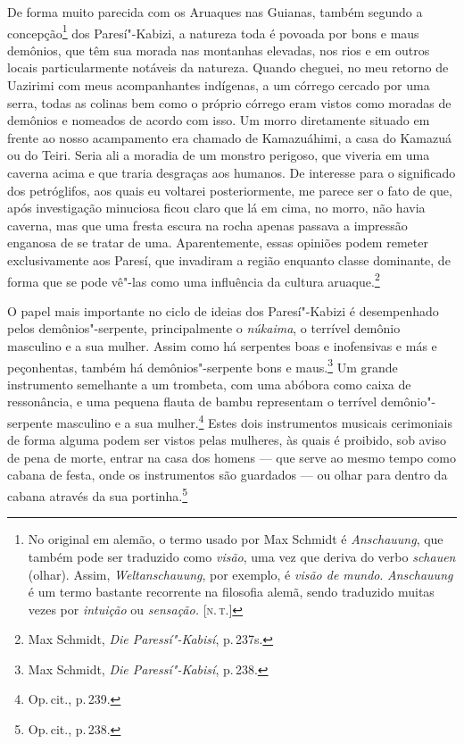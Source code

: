 De forma muito parecida com os Aruaques nas Guianas, também segundo a
concepção\footnote{No original em alemão, o termo usado por Max
  Schmidt é \textit{Anschauung}, que também pode ser traduzido como
  \textit{visão}, uma vez que deriva do verbo \textit{schauen} (olhar).
  Assim, \textit{Weltanschauung}, por exemplo, é \textit{visão de mundo}.
  \textit{Anschauung} é um termo bastante recorrente na filosofia alemã,
  sendo traduzido muitas vezes por \textit{intuição} ou \textit{sensação.}
  {[}\textsc{n.\,t.}{]}} dos Paresí"-Kabizi, a natureza toda é povoada por bons e maus
demônios, que têm sua morada nas montanhas elevadas, nos rios e em
outros locais particularmente notáveis da natureza. Quando cheguei, no
meu retorno de Uazirimi com meus acompanhantes indígenas, a um córrego
cercado por uma serra, todas as colinas bem como o próprio córrego eram
vistos como moradas de demônios e nomeados de acordo com isso. Um morro
diretamente situado em frente ao nosso acampamento era chamado de
Kamazuáhimi, a casa do Kamazuá ou do Teiri. Seria ali a moradia de um
monstro perigoso, que viveria em uma caverna acima e que traria
desgraças aos humanos. De interesse para o significado dos petróglifos,
aos quais eu voltarei posteriormente, me parece ser o fato de que, após
investigação minuciosa ficou claro que lá em cima, no morro, não havia
caverna, mas que uma fresta escura na rocha apenas passava a impressão
enganosa de se tratar de uma. Aparentemente, essas opiniões podem
remeter exclusivamente aos Paresí, que invadiram a região enquanto
classe dominante, de forma que se pode vê"-las como uma influência da
cultura aruaque.\footnote{Max Schmidt, \textit{Die Paressí"-Kabisí}, p.\,237s.}

{O papel mais importante no ciclo de ideias dos Paresí"-Kabizi é
desempenhado pelos demônios"-serpente, principalmente o \textit{núkaima},
o terrível demônio masculino e a sua mulher. Assim como há serpentes
boas e inofensivas e más e peçonhentas, também há demônios"-serpente
bons e maus.\footnote{Max Schmidt, \textit{Die Paressí"-Kabisí}, p.\,238.} Um
grande instrumento semelhante a um trombeta, com uma abóbora como caixa
de ressonância, e uma pequena flauta de bambu representam o terrível
demônio"-serpente masculino e a sua mulher.\footnote{Op.\,cit., p.\,239.}
Estes dois instrumentos musicais cerimoniais de forma alguma podem ser
vistos pelas mulheres, às quais é proibido, sob aviso de pena de morte,
entrar na casa dos homens --- que serve ao mesmo tempo como cabana de
festa, onde os instrumentos são guardados --- ou olhar para dentro da
cabana através da sua portinha.\footnote{Op.\,cit., p.\,238.}}

